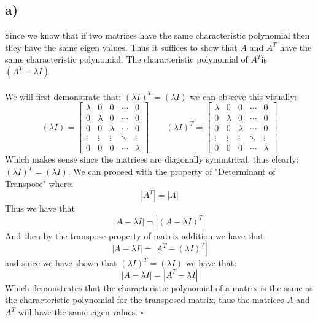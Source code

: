 \documentclass{article}
\begin{document}
\subsection*{a)}
Since we know that if two matrices have the same characteristic polynomial then they have the same eigen values. Thus it suffices to show that $A$ and $A^{T}$ have the same characteristic polynomial. The characteristic polynomial of $A^{T}$is $(A^{T}-\lambda I)$\\\\ 
We will first demonstrate that: $(\lambda I)^{T}=(\lambda I)$ we can observe this visually: 
$$(\lambda I) = 
\begin{bmatrix} 
\lambda & 0 & 0 & \cdots & 0 \\ 
0 & \lambda & 0 & \cdots & 0 \\ 
0 & 0 & \lambda & \cdots & 0 \\ 
\vdots & \vdots & \vdots & \ddots & \vdots \\ 
0 & 0 & 0 & \cdots & \lambda 
\end{bmatrix}\;\;\;\;\;\;\;(\lambda I)^T = 
\begin{bmatrix} 
\lambda & 0 & 0 & \cdots & 0 \\ 
0 & \lambda & 0 & \cdots & 0 \\ 
0 & 0 & \lambda & \cdots & 0 \\ 
\vdots & \vdots & \vdots & \ddots & \vdots \\ 
0 & 0 & 0 & \cdots & \lambda 
\end{bmatrix}$$
Which makes sense since the matrices are diagonally symmtrical, thus clearly: $(\lambda I)^{T}=(\lambda I)$. We can proceed with the property of "Determinant of Transpose" where: $$\left\vert A^{T} \right\vert = \left\vert A \right\vert $$
Thus we have that $$\left\vert A-\lambda I \right\vert = \left\vert (A-\lambda I )^{T} \right\vert $$
And then by the transpose property of matrix addition we have that: $$\left\vert A-\lambda I \right\vert = \left\vert A^{T}-(\lambda I)^{T}  \right\vert $$
and since we have shown that $(\lambda I)^{T}=(\lambda I)$ we have that: $$\left\vert A-\lambda I \right\vert = \left\vert A^{T}-\lambda I  \right\vert $$
Which demonstrates that the characteristic polynomial of a matrix is the same as the characteristic polynomial for the transposed matrix, thus the matrices $A$ and $A^{T}$ will have the same eigen values. $\square$
\end{document}
